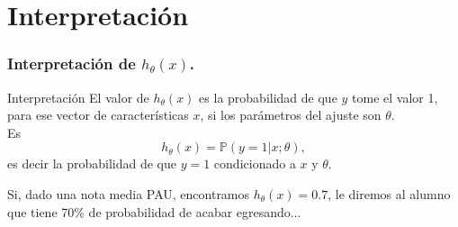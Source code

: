 \documentclass{beamer}
\newcommand{\field}[1]{\mathbb{#1}}
\renewcommand{\P}{\field{P}}
\begin{document}
 \section{Interpretación}
 \begin{frame}\frametitle{Interpretación de $h_\theta(x)$.}
   \begin{block}{Interpretación}
     El valor de $h_\theta(x)$ es la probabilidad de que $y$ tome el valor 1, para ese vector de características $x$, si los parámetros del ajuste son $\theta$.\\
     Es $$h_\theta(x)=\P(y=1|x;\theta),$$
     es decir la probabilidad de que $y=1$ condicionado a $x$ y $\theta$. 
   \end{block}
   Si, dado una nota media PAU, encontramos $h_\theta(x)=0.7$, le diremos al alumno que tiene 70\% de probabilidad de acabar egresando... 
 \end{frame}
\end{document}
